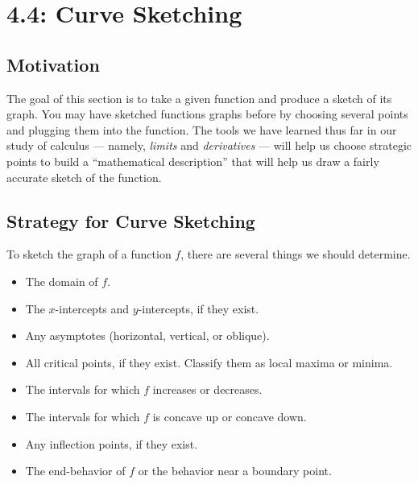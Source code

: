 \documentclass[12pt]{article}
\begin{document}
\section*{4.4: Curve Sketching}


\vspace{5mm}

\subsection*{Motivation}

The goal of this section is to take a given function and produce a sketch of its graph. You may have sketched functions graphs before by choosing several points and plugging them into the function. The tools we have learned thus far in our study of calculus --- namely, \textit{limits} and \textit{derivatives} --- will help us choose strategic points to build a ``mathematical description'' that will help us draw a fairly accurate sketch of the function.

\subsection*{Strategy for Curve Sketching}

To sketch the graph of a function $f$, there are several things we should determine.
\begin{itemize}
\item The domain of $f$.
\item The $x$-intercepts and $y$-intercepts, if they exist.
\item Any asymptotes (horizontal, vertical, or oblique).
\item All critical points, if they exist. Classify them as local maxima or minima.
\item The intervals for which $f$ increases or decreases.
\item The intervals for which $f$ is concave up or concave down.
\item Any inflection points, if they exist.
\item The end-behavior of $f$ or the behavior near a boundary point.
\end{itemize}
\end{document}
